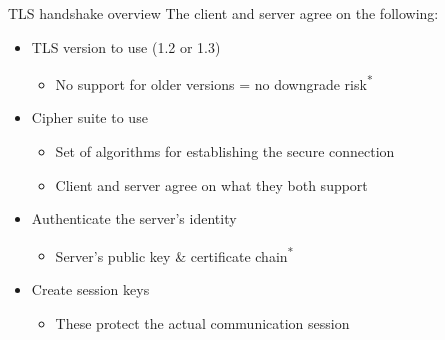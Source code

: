 \begin{frame}{TLS handshake overview}
  The client and server agree on the following:
  \begin{itemize}[<+(1)->]
    \item TLS version to use (1.2 or 1.3)
    \begin{itemize}
      \item No support for older versions = no downgrade risk\textsuperscript{*}
    \end{itemize}
    \item Cipher suite to use
    \begin{itemize}
      \item Set of algorithms for establishing the secure connection
      \item Client and server agree on what they both support
    \end{itemize}
    \item Authenticate the server's identity
    \begin{itemize}
      \item Server's public key \& certificate chain\textsuperscript{*}
    \end{itemize}
    \item Create session keys
    \begin{itemize}
      \item These protect the actual communication session
    \end{itemize}
  \end{itemize}
\end{frame}

